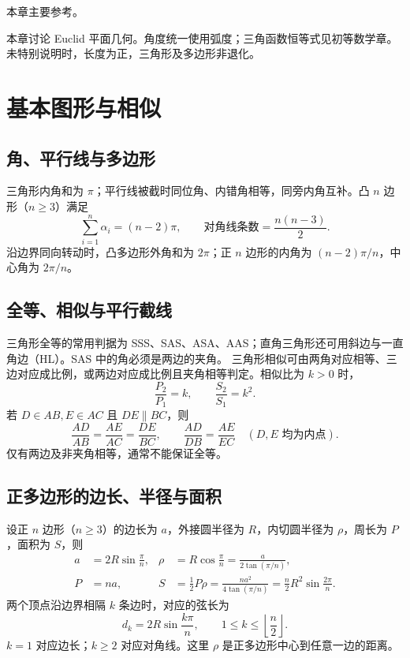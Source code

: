 \documentclass[../main.tex]{subfiles}
\begin{document}
本章主要参考\cite{euclid,geometry}。

本章讨论 Euclid 平面几何。角度统一使用弧度；三角函数恒等式见初等数学章。未特别说明时，长度为正，三角形及多边形非退化。
\section{基本图形与相似}
\subsection{角、平行线与多边形}
三角形内角和为 $\pi$；平行线被截时同位角、内错角相等，同旁内角互补。凸 $n$ 边形（$n\ge3$）满足
\[
\sum_{i=1}^n\alpha_i=(n-2)\pi,\qquad
\text{对角线条数}=\frac{n(n-3)}2.
\]
沿边界同向转动时，凸多边形外角和为 $2\pi$；正 $n$ 边形的内角为 $(n-2)\pi/n$，中心角为 $2\pi/n$。
\subsection{全等、相似与平行截线}
三角形全等的常用判据为 SSS、SAS、ASA、AAS；直角三角形还可用斜边与一直角边（HL）。SAS 中的角必须是两边的夹角。
三角形相似可由两角对应相等、三边对应成比例，或两边对应成比例且夹角相等判定。相似比为 $k>0$ 时，
\[
\frac{P_2}{P_1}=k,\qquad\frac{S_2}{S_1}=k^2.
\]
若 $D\in AB,E\in AC$ 且 $DE\parallel BC$，则
\[
\frac{AD}{AB}=\frac{AE}{AC}=\frac{DE}{BC},\qquad
\frac{AD}{DB}=\frac{AE}{EC}\quad(D,E\text{ 均为内点}).
\]
仅有两边及非夹角相等，通常不能保证全等。
\subsection{正多边形的边长、半径与面积}
设正 $n$ 边形（$n\ge3$）的边长为 $a$，外接圆半径为 $R$，内切圆半径为 $\rho$，周长为 $P$，面积为 $S$，则
\begin{align*}
a&=2R\sin\frac\pi n, &
\rho&=R\cos\frac\pi n=\frac{a}{2\tan(\pi/n)},\\
P&=na, & S&=\frac12P\rho=\frac{na^2}{4\tan(\pi/n)}
=\frac n2R^2\sin\frac{2\pi}{n}.
\end{align*}
两个顶点沿边界相隔 $k$ 条边时，对应的弦长为
\[
d_k=2R\sin\frac{k\pi}{n},\qquad
1\le k\le\left\lfloor\frac n2\right\rfloor.
\]
$k=1$ 对应边长；$k\ge2$ 对应对角线。这里 $\rho$ 是正多边形中心到任意一边的距离。
\end{document}
